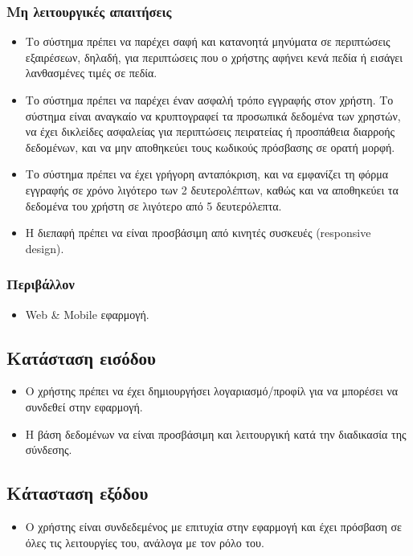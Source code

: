 \documentclass[12pt,a4paper,twoside]{book}
\begin{document}
\subsubsection{Μη λειτουργικές απαιτήσεις}
\begin{itemize}
  \item Το σύστημα πρέπει να παρέχει σαφή και κατανοητά μηνύματα σε περιπτώσεις εξαιρέσεων, δηλαδή, για περιπτώσεις που ο χρήστης αφήνει κενά πεδία ή εισάγει λανθασμένες τιμές σε πεδία.%
  \item Το σύστημα πρέπει να παρέχει έναν ασφαλή τρόπο εγγραφής στον χρήστη. Το σύστημα είναι αναγκαίο να κρυπτογραφεί τα προσωπικά δεδομένα των χρηστών, να έχει δικλείδες ασφαλείας για περιπτώσεις πειρατείας ή προσπάθεια διαρροής δεδομένων, και να μην αποθηκεύει τους κωδικούς πρόσβασης σε ορατή μορφή. %
  \item Το σύστημα πρέπει να έχει γρήγορη ανταπόκριση, και να εμφανίζει τη φόρμα εγγραφής σε χρόνο λιγότερο των 2 δευτερολέπτων, καθώς και να αποθηκεύει τα δεδομένα του χρήστη σε λιγότερο από 5 δευτερόλεπτα. %
  \item Η διεπαφή πρέπει να είναι προσβάσιμη από κινητές συσκευές (responsive design). %
\end{itemize}

\subsubsection{Περιβάλλον}
\begin{itemize}
  \item Web \& Mobile εφαρμογή.
\end{itemize}

\subsection{Κατάσταση εισόδου} %
\begin{itemize}
  \item Ο χρήστης πρέπει να έχει δημιουργήσει λογαριασμό/προφίλ για να μπορέσει να συνδεθεί στην εφαρμογή. %
  \item Η βάση δεδομένων να είναι προσβάσιμη και λειτουργική κατά την διαδικασία της σύνδεσης. %
\end{itemize}

\subsection{Κάτασταση εξόδου} %
\begin{itemize}
  \item Ο χρήστης είναι συνδεδεμένος με επιτυχία στην εφαρμογή και έχει πρόσβαση σε όλες τις λειτουργίες του, ανάλογα με τον ρόλο του. %
\end{itemize}
\end{document}
